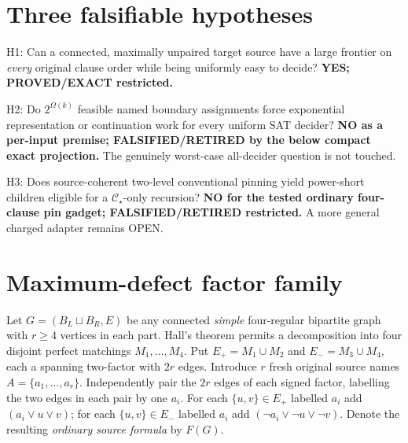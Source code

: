 \documentclass[11pt]{article}
\newcommand{\CS}{\mathcal C_\star}
\begin{document}
\section{Three falsifiable hypotheses}
\noindent H1: Can a connected, maximally unpaired target source have a large frontier on \emph{every} original clause order while being uniformly easy to decide? \textbf{YES; PROVED/EXACT restricted.}

\noindent H2: Do $2^{\Omega(k)}$ feasible named boundary assignments force exponential representation or continuation work for every uniform SAT decider? \textbf{NO as a per-input premise; FALSIFIED/RETIRED by the below compact exact projection.} The genuinely worst-case all-decider question is not touched.

\noindent H3: Does source-coherent two-level conventional pinning yield power-short children eligible for a $\CS$-only recursion? \textbf{NO for the tested ordinary four-clause pin gadget; FALSIFIED/RETIRED restricted.} A more general charged adapter remains OPEN.

\section{Maximum-defect factor family}
Let $G=(B_L\sqcup B_R,E)$ be any connected \emph{simple} four-regular bipartite graph with $r\ge4$ vertices in each part. Hall's theorem permits a decomposition into four disjoint perfect matchings $M_1,\dots,M_4$. Put $E_+=M_1\cup M_2$ and $E_-=M_3\cup M_4$, each a spanning two-factor with $2r$ edges. Introduce $r$ fresh original source names $A=\{a_1,\dots,a_r\}$. Independently pair the $2r$ edges of each signed factor, labelling the two edges in each pair by one $a_i$. For each $\{u,v\}\in E_+$ labelled $a_i$ add $(a_i\vee u\vee v)$; for each $\{u,v\}\in E_-$ labelled $a_i$ add $(\neg a_i\vee\neg u\vee\neg v)$. Denote the resulting \emph{ordinary source formula} by $F(G)$.
\end{document}
